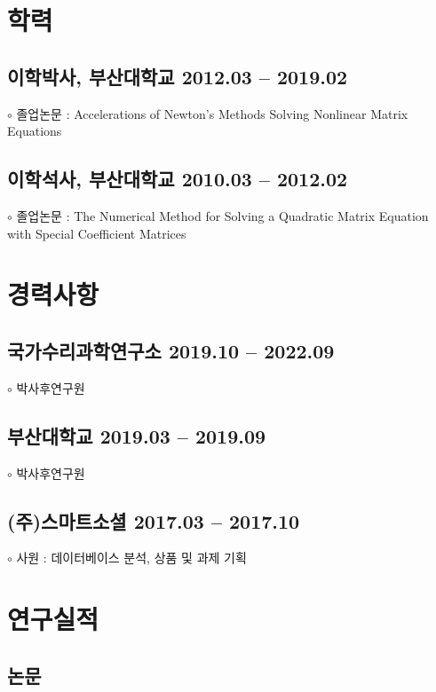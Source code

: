 \documentclass[11pt]{article} %
\newcommand\myedu{
	\subsection*{이학박사, 부산대학교 \hfill 2012.03 -- 2019.02} %
	$\circ$ 졸업논문 : Accelerations of Newton's Methods Solving Nonlinear Matrix Equations
	
	\subsection*{이학석사, 부산대학교 \hfill 2010.03 -- 2012.02} %
	$\circ$ 졸업논문 : The Numerical Method for Solving a Quadratic Matrix Equation with Special Coefficient Matrices
}
\newcommand\mycareer{
	\subsection*{국가수리과학연구소 \hfill 2019.10 -- 2022.09}
	$\circ$ 박사후연구원
	\subsection*{부산대학교 \hfill 2019.03 -- 2019.09}
	$\circ$ 박사후연구원
	\subsection*{(주)스마트소셜 \hfill 2017.03 -- 2017.10}
	$\circ$ 사원 : 데이터베이스 분석, 상품 및 과제 기획
}
\newcommand\mypapers{
	
}
\begin{document}

%

\section*{학력}

\myedu


%

\section*{경력사항}

\mycareer

\section*{연구실적}

\subsection*{논문}

\mypapers
\end{document}
